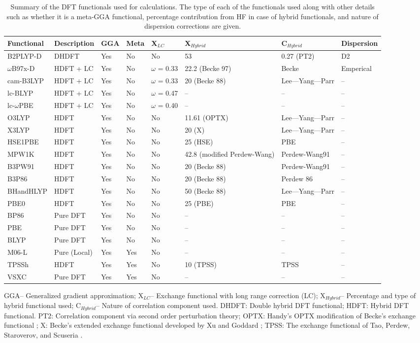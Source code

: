 \begin{table}[t]
\caption{Summary of the DFT functionals used for calculations. The type of each of the functionals used along with other details such as whether it is a meta-GGA functional, percentage contribution from HF in case of hybrid functionals, and nature of dispersion corrections are given.} \label{functionals}
\begin{adjustbox}{max width=0.98\textwidth}
\begin{tabular}{llllllll}
\hline
Functional&Description&GGA&Meta&X$_{LC}$&X$_{Hybrid}$&C$_{Hybrid}$&Dispersion\\ \hline
 B2PLYP-D&DHDFT&Yes&No&No&53&0.27 (PT2)&D2\\
$\omega$B97x-D&HDFT + LC&Yes&No&$\omega$ = 0.33&22.2 (Becke 97)& Becke &Emperical\\
 cam-B3LYP&HDFT + LC&Yes&No&$\omega$ = 0.33&20 (Becke 88)&Lee—Yang—Parr&--\\
 lc-BLYP&HDFT + LC&Yes&No&$\omega$ = 0.47&--&--&--\\
  lc-$\omega$PBE&HDFT + LC&Yes&No&$\omega$ = 0.40&--&--&--\\
 O3LYP&HDFT&Yes&No&No&11.61 (OPTX)&Lee—Yang—Parr&--\\
X3LYP&HDFT&Yes&No&No&20 (X)&Lee—Yang—Parr&--\\
HSE1PBE&HDFT&Yes&No&No&25 (HSE)&PBE&--\\
MPW1K&HDFT&Yes&No&No&42.8 (modified Perdew-Wang)&Perdew-Wang91&--\\
B3PW91&HDFT&Yes&No&No&20 (Becke 88)&Perdew-Wang91&--\\
B3P86&HDFT&Yes&No&No&20 (Becke 88)&Perdew 86&--\\
BHandHLYP&HDFT&Yes&No&No&50 (Becke 88)&Lee—Yang—Parr&--\\
PBE0&HDFT&Yes&No&No&25 (PBE)&PBE&--\\
 BP86&Pure DFT&Yes&No&No&--&--&--\\
PBE&Pure DFT&Yes&No&No&--&--&--\\
BLYP&Pure DFT&Yes&No&No&--&--&--\\
 M06-L&Pure (Local)&Yes&Yes&No&--&--&--\\
TPSSh&HDFT&Yes&Yes&No&10 (TPSS)&TPSS&--\\
VSXC&Pure DFT&Yes&Yes&No&--&--&--\\
\hline
\end{tabular}
\end{adjustbox}
\begin{flushleft}
GGA-- Generalized gradient approximation; X$_{LC}$-- Exchange functional with long range correction (LC); X$_{Hybrid}$-- Percentage and type of hybrid functional used; C$_{Hybrid}$-- Nature of correlation component used. DHDFT: Double hybrid DFT functional; HDFT: Hybrid DFT functional. PT2: Correlation component via second order perturbation theory; OPTX: Handy's OPTX modification of Becke's exchange functional \cite{handy2001,Hoe2001}; X: Becke's extended exchange functional developed by Xu and Goddard \cite{Xu2004}; TPSS: The exchange functional of Tao, Perdew, Staroverov, and Scuseria \cite{tao2003}.
\end{flushleft}
\end{table}
